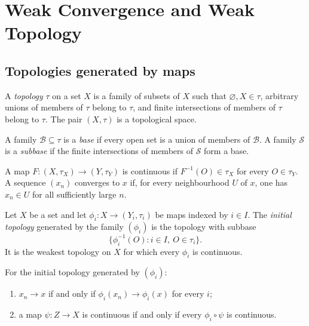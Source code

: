 \chapter{Weak Convergence and Weak Topology}

\section{Topologies generated by maps}

\begin{notedefinition}
A \emph{topology} $\tau$ on a set $X$ is a family of subsets of $X$ such that
$\varnothing,X\in\tau$, arbitrary unions of members of $\tau$ belong to
$\tau$, and finite intersections of members of $\tau$ belong to $\tau$.  The
pair $(X,\tau)$ is a topological space.

A family $\mathcal B\subseteq\tau$ is a \emph{base} if every open set is a
union of members of $\mathcal B$.  A family $\mathcal S$ is a
\emph{subbase} if the finite intersections of members of $\mathcal S$ form a
base.
\end{notedefinition}

\begin{notedefinition}
A map $F\colon(X,\tau_X)\to(Y,\tau_Y)$ is continuous if
$F^{-1}(O)\in\tau_X$ for every $O\in\tau_Y$.  A sequence $(x_n)$ converges to
$x$ if, for every neighbourhood $U$ of $x$, one has $x_n\in U$ for all
sufficiently large $n$.
\end{notedefinition}

\begin{notedefinition}
Let $X$ be a set and let $\phi_i\colon X\to(Y_i,\tau_i)$ be maps indexed by
$i\in I$.  The \emph{initial topology} generated by the family $(\phi_i)$ is
the topology with subbase
\[
  \{\phi_i^{-1}(O):i\in I,\ O\in\tau_i\}.
\]
It is the weakest topology on $X$ for which every $\phi_i$ is continuous.
\end{notedefinition}

\begin{noteproposition}
For the initial topology generated by $(\phi_i)$:
\begin{enumerate}
  \item $x_n\to x$ if and only if $\phi_i(x_n)\to\phi_i(x)$ for every $i$;
  \item a map $\psi\colon Z\to X$ is continuous if and only if every
        $\phi_i\circ\psi$ is continuous.
\end{enumerate}
\end{noteproposition}

